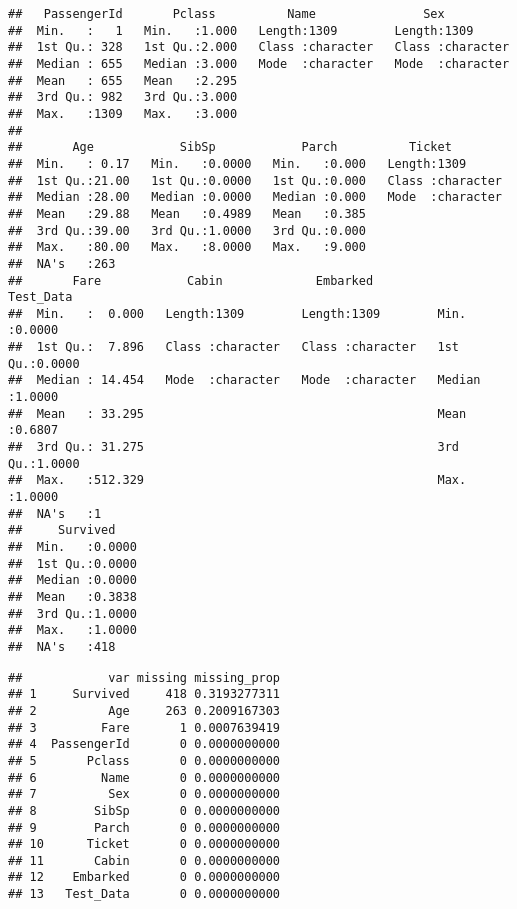 \documentclass[
]{article}
\begin{document}
\begin{verbatim}
##   PassengerId       Pclass          Name               Sex           
##  Min.   :   1   Min.   :1.000   Length:1309        Length:1309       
##  1st Qu.: 328   1st Qu.:2.000   Class :character   Class :character  
##  Median : 655   Median :3.000   Mode  :character   Mode  :character  
##  Mean   : 655   Mean   :2.295                                        
##  3rd Qu.: 982   3rd Qu.:3.000                                        
##  Max.   :1309   Max.   :3.000                                        
##                                                                      
##       Age            SibSp            Parch          Ticket         
##  Min.   : 0.17   Min.   :0.0000   Min.   :0.000   Length:1309       
##  1st Qu.:21.00   1st Qu.:0.0000   1st Qu.:0.000   Class :character  
##  Median :28.00   Median :0.0000   Median :0.000   Mode  :character  
##  Mean   :29.88   Mean   :0.4989   Mean   :0.385                     
##  3rd Qu.:39.00   3rd Qu.:1.0000   3rd Qu.:0.000                     
##  Max.   :80.00   Max.   :8.0000   Max.   :9.000                     
##  NA's   :263                                                        
##       Fare            Cabin             Embarked           Test_Data     
##  Min.   :  0.000   Length:1309        Length:1309        Min.   :0.0000  
##  1st Qu.:  7.896   Class :character   Class :character   1st Qu.:0.0000  
##  Median : 14.454   Mode  :character   Mode  :character   Median :1.0000  
##  Mean   : 33.295                                         Mean   :0.6807  
##  3rd Qu.: 31.275                                         3rd Qu.:1.0000  
##  Max.   :512.329                                         Max.   :1.0000  
##  NA's   :1                                                               
##     Survived     
##  Min.   :0.0000  
##  1st Qu.:0.0000  
##  Median :0.0000  
##  Mean   :0.3838  
##  3rd Qu.:1.0000  
##  Max.   :1.0000  
##  NA's   :418
\end{verbatim}

\begin{verbatim}
##            var missing missing_prop
## 1     Survived     418 0.3193277311
## 2          Age     263 0.2009167303
## 3         Fare       1 0.0007639419
## 4  PassengerId       0 0.0000000000
## 5       Pclass       0 0.0000000000
## 6         Name       0 0.0000000000
## 7          Sex       0 0.0000000000
## 8        SibSp       0 0.0000000000
## 9        Parch       0 0.0000000000
## 10      Ticket       0 0.0000000000
## 11       Cabin       0 0.0000000000
## 12    Embarked       0 0.0000000000
## 13   Test_Data       0 0.0000000000
\end{verbatim}
\end{document}

